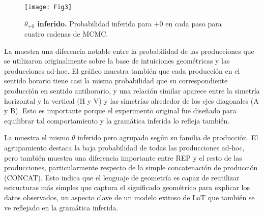 \begin{figure}[htpb]
    \centering
    \texttt{[image: Fig3]}
    \caption{{\bf $\theta_{\text{+0}}$ inferido.} Probabilidad inferida para +0 en cada paso para cuatro cadenas de MCMC.}
    \label{fig:convergetheta}
\end{figure}


La  muestra una diferencia notable entre la probabilidad de las producciones que se utilizaron originalmente sobre la base de intuiciones geométricas y las producciones ad-hoc. El gráfico muestra también que cada producción en el sentido horario tiene casi la misma probabilidad que su correspondiente producción en sentido antihorario, y una relación similar aparece entre la simetría horizontal y la vertical (H y V) y las simetrías alrededor de los ejes diagonales (A y B). Esto es importante porque el experimento original fue diseñado para equilibrar tal comportamiento y la gramática inferida lo refleja también.


La  muestra el mismo $\theta$ inferido pero agrupado según su familia de producción. El agrupamiento destaca la baja probabilidad de todas las producciones ad-hoc, pero también muestra una diferencia importante entre REP y el resto de las producciones, particularmente respecto de la simple concatenación de producción (CONCAT). Esto indica que el lenguaje de geometría es capaz de reutilizar estructuras más simples que captura el significado geométrico para explicar los datos observados, un aspecto clave de un modelo exitoso de LoT que también se ve reflejado en la gramática inferida.

